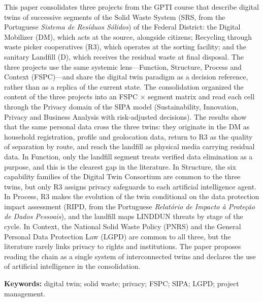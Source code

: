 \documentclass[12pt,a4paper,article,oneside,brazil,english]{abntex2}
\begin{document}
\begin{resumo}[Abstract]
This paper consolidates three projects from the GPTI course that describe digital twins of successive segments of the Solid Waste System (SRS, from the Portuguese \textit{Sistema de Resíduos Sólidos}) of the Federal District: the Digital Mobilizer (DM), which acts at the source, alongside citizens; Recycling through waste picker cooperatives (R3), which operates at the sorting facility; and the sanitary Landfill (D), which receives the residual waste at final disposal. The three projects use the same systemic lens---Function, Structure, Process and Context (FSPC)---and share the digital twin paradigm as a decision reference, rather than as a replica of the current state. The consolidation organized the content of the three projects into an FSPC $\times$ segment matrix and read each cell through the Privacy domain of the SIPA model (Sustainability, Innovation, Privacy and Business Analysis with risk-adjusted decisions). The results show that the same personal data cross the three twins: they originate in the DM as household registration, profile and geolocation data, return to R3 as the quality of separation by route, and reach the landfill as physical media carrying residual data. In Function, only the landfill segment treats verified data elimination as a purpose, and this is the clearest gap in the literature. In Structure, the six capability families of the Digital Twin Consortium are common to the three twins, but only R3 assigns privacy safeguards to each artificial intelligence agent. In Process, R3 makes the evolution of the twin conditional on the data protection impact assessment (RIPD, from the Portuguese \textit{Relatório de Impacto à Proteção de Dados Pessoais}), and the landfill maps LINDDUN threats by stage of the cycle. In Context, the National Solid Waste Policy (PNRS) and the General Personal Data Protection Law (LGPD) are common to all three, but the literature rarely links privacy to rights and institutions. The paper proposes reading the chain as a single system of interconnected twins and declares the use of artificial intelligence in the consolidation.

\vspace{\onelineskip}
\noindent\textbf{Keywords:} digital twin; solid waste; privacy; FSPC; SIPA; LGPD; project management.
\end{resumo}
\end{document}
